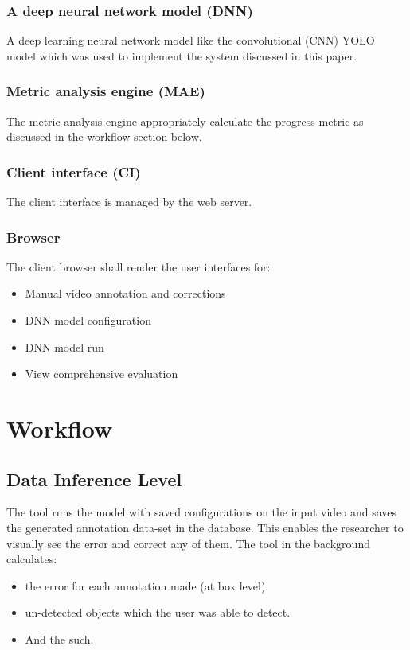 \documentclass[conference]{IEEEtran}
\begin{document}
\subsubsection{A deep neural network model (DNN)}
A deep learning neural network model like the convolutional (CNN) YOLO model which was used to implement the system discussed in this paper.
\subsubsection{Metric analysis engine (MAE)}
The metric analysis engine appropriately calculate the progress-metric as discussed in the workflow section below.
\subsubsection{Client interface (CI)}
The client interface is managed by the web server.
\subsubsection{Browser}
The client browser shall render the user interfaces for:
\begin{itemize}
	\item Manual video annotation and corrections
	\item DNN model configuration
	\item DNN model run
	\item View comprehensive evaluation
\end{itemize}

\section{Workflow}
\subsection{Data Inference Level}
The tool runs the model with saved configurations on the input video and saves the generated annotation data-set in the database. This enables the researcher to visually see the error and correct any of them. The tool in the background calculates:
\begin{itemize}
	\item the error for each annotation made (at box level).
	\item un-detected objects which the user was able to detect.
	\item And the such.
\end{itemize}
\end{document}
